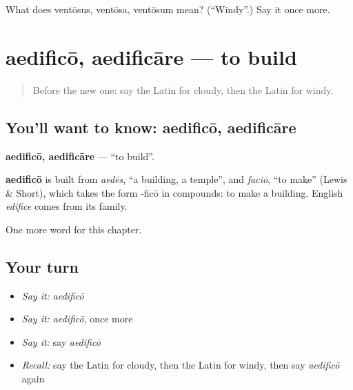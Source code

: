 \begin{tcolorbox}[breakable,colback=teal!4,colframe=teal!35!black,title={Before you move on}]
What does ventōsus, ventōsa, ventōsum mean? (\textquotedblleft{}Windy\textquotedblright{}.) Say it once more.
\end{tcolorbox}
\section[aedificō, aedificāre]{aedificō, aedificāre — to build}

\label{lesson:LA-C153-aedifico}



\begin{quote}
Before the new one: say the Latin for cloudy, then the Latin for windy.
\end{quote}

\subsection*{You'll want to know: aedificō, aedificāre}
\textbf{aedificō, aedificāre} — \textquotedblleft{}to build\textquotedblright{}.

\begin{cousinweb}
\textbf{aedificō} is built from \emph{aedēs}, \textquotedblleft{}a building, a temple\textquotedblright{}, and \emph{faciō}, \textquotedblleft{}to make\textquotedblright{} (Lewis \& Short), which takes the form -ficō in compounds: to make a building. English \emph{edifice} comes from its family.
\end{cousinweb}

\begin{grammarlens}[title={What you've built}]
One more word for this chapter.
\end{grammarlens}

\subsection*{Your turn}
\begin{itemize}
\raggedright
  \item \emph{Say it:} \emph{aedificō}
  \item \emph{Say it:} \emph{aedificō}, once more
  \item \emph{Say it:} say \emph{aedificō}
  \item \emph{Recall:} say the Latin for cloudy, then the Latin for windy, then say \emph{aedificō} again
\end{itemize}

